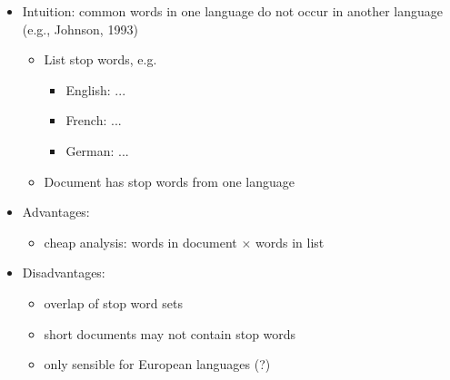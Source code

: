 \documentclass[a4paper,landscape,headrule,footrule,xetex]{foils}
\begin{document}

\begin{itemize}
\item Intuition: common words in one language do not occur in another
  language (e.g., Johnson, 1993)
\begin{itemize}
\item List stop words, e.g.\ 
\begin{itemize}
\item English: ...
\item French: ...
\item German: ...
\end{itemize}
\item Document has stop words from one language
\end{itemize}
\item Advantages:
  \begin{itemize}
  \item cheap analysis: words in document $\times$ words in list
  \end{itemize}
\item Disadvantages:
  \begin{itemize}
  \item overlap of stop word sets
  \item short documents may not contain stop words
  \item only sensible for European languages (?)
  \end{itemize}
\end{itemize}











\end{document}
